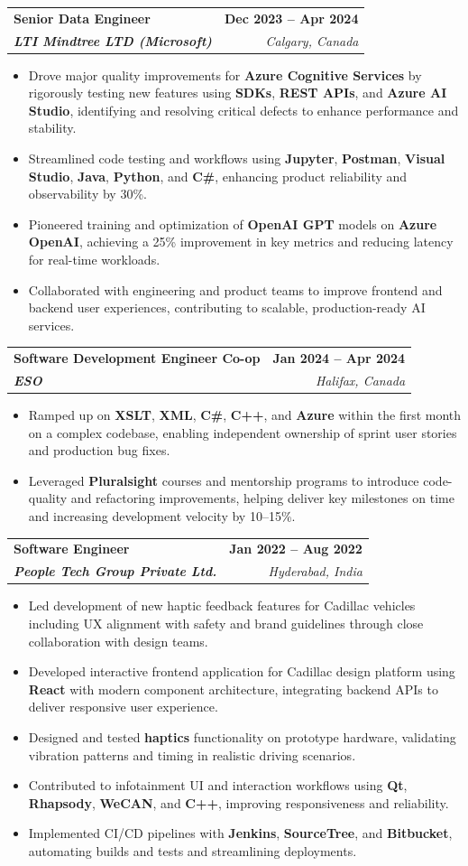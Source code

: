\documentclass[letterpaper,11pt]{article}
\makeatletter
\newcommand{\resumeItem}[1]{
  \item\small{
    {#1 \vspace{-2pt}}
  }
}
\newcommand{\resumeSubheading}[4]{
  \vspace{-2pt}\item
    \begin{tabular*}{1.0\textwidth}[t]{l@{\extracolsep{\fill}}r}
      \textbf{#1} & \textbf{\small #2} \\
      \textit{\small#3} & \textit{\small #4} \\
    \end{tabular*}\vspace{-7pt}
}
\newcommand{\resumeItemListStart}{\begin{itemize}}
\newcommand{\resumeItemListEnd}{\end{itemize}\vspace{-5pt}}
\makeatother
\begin{document}
    \resumeSubheading
      {\textbf{Senior Data Engineer}}{\textbf{Dec 2023 -- Apr 2024}}
      {\textbf{LTI Mindtree LTD (Microsoft)}}{Calgary, Canada}
      \resumeItemListStart
        \resumeItem{Drove major quality improvements for \textbf{Azure Cognitive Services} by rigorously testing new features using \textbf{SDKs}, \textbf{REST APIs}, and \textbf{Azure AI Studio}, identifying and resolving critical defects to enhance performance and stability.}
        \resumeItem{Streamlined code testing and workflows using \textbf{Jupyter}, \textbf{Postman}, \textbf{Visual Studio}, \textbf{Java}, \textbf{Python}, and \textbf{C\#}, enhancing product reliability and observability by 30\%.}
        \resumeItem{Pioneered training and optimization of \textbf{OpenAI GPT} models on \textbf{Azure OpenAI}, achieving a 25\% improvement in key metrics and reducing latency for real-time workloads.}
        \resumeItem{Collaborated with engineering and product teams to improve frontend and backend user experiences, contributing to scalable, production-ready AI services.}
      \resumeItemListEnd
    
    \resumeSubheading
      {\textbf{Software Development Engineer Co-op}}{\textbf{Jan 2024 -- Apr 2024}}
      {\textbf{ESO}}{Halifax, Canada}
      \resumeItemListStart
        \resumeItem{Ramped up on \textbf{XSLT}, \textbf{XML}, \textbf{C\#}, \textbf{C++}, and \textbf{Azure} within the first month on a complex codebase, enabling independent ownership of sprint user stories and production bug fixes.}
        \resumeItem{Leveraged \textbf{Pluralsight} courses and mentorship programs to introduce code-quality and refactoring improvements, helping deliver key milestones on time and increasing development velocity by 10–15\%.}
      \resumeItemListEnd

    \resumeSubheading
      {\textbf{Software Engineer}}{\textbf{Jan 2022 -- Aug 2022}}
      {\textbf{People Tech Group Private Ltd.}}{Hyderabad, India}
      \resumeItemListStart
        \resumeItem{Led development of new haptic feedback features for Cadillac vehicles including UX alignment with safety and brand guidelines through close collaboration with design teams.}
        \resumeItem{Developed interactive frontend application for Cadillac design platform using \textbf{React} with modern component architecture, integrating backend APIs to deliver responsive user experience.}
        \resumeItem{Designed and tested \textbf{haptics} functionality on prototype hardware, validating vibration patterns and timing in realistic driving scenarios.}
        \resumeItem{Contributed to infotainment UI and interaction workflows using \textbf{Qt}, \textbf{Rhapsody}, \textbf{WeCAN}, and \textbf{C++}, improving responsiveness and reliability.}
        \resumeItem{Implemented CI/CD pipelines with \textbf{Jenkins}, \textbf{SourceTree}, and \textbf{Bitbucket}, automating builds and tests and streamlining deployments.}
      \resumeItemListEnd
\end{document}
